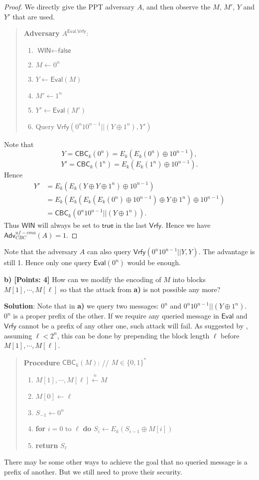 \documentclass[12pt]{article}
\newcommand{\bits}{\{0,1\}}
\newcommand{\getsn}{\stackrel{n}{\gets}}
\newcommand{\Adv}{\textsf{Adv}}
\newcommand{\CBC}{\textsf{CBC}}
\newcommand{\Eval}{\textsf{Eval}}
\newcommand{\Vrfy}{\textsf{Vrfy}}
\newcommand{\WIN}{\textsf{WIN}}
\newcommand{\true}{\textsf{true}}
\newcommand{\false}{\textsf{false}}
\theoremstyle{definition}
\begin{document}
\begin{proof}
We directly give the PPT adversary $A$, and then observe the $M$, $M'$, $Y$ and $Y'$ that are used.
\begin{quote}
{\bf Adversary} $A^{\Eval, \Vrfy}$:
\begin{enumerate}
\item $\WIN \gets \false$
\item $M \gets 0^n$
\item $Y \gets \Eval(M)$
\item $M' \gets 1^n$
\item $Y' \gets \Eval(M')$
\item Query $\Vrfy(0^n10^{n-1}||(Y \oplus 1^n), Y')$
\end{enumerate}
\end{quote}
Note that 
$$Y = \CBC_k (0^n) = E_k(E_k(0^n) \oplus 10^{n-1}),$$
$$Y' = \CBC_k (1^n) = E_k(E_k(1^n) \oplus 10^{n-1}).$$
Hence
$$\begin{aligned}
Y' &= E_k(E_k(Y \oplus Y \oplus 1^n) \oplus 10^{n-1}) \\
&= E_k(E_k(E_k(E_k(0^n) \oplus 10^{n-1}) \oplus Y \oplus 1^n) \oplus 10^{n-1}) \\
&= \CBC_k (0^n10^{n-1} || (Y \oplus 1^n)).
\end{aligned}$$
Thus $\WIN$ will always be set to $\true$ in the last $\Vrfy$. Hence we have $\Adv_{CBC}^{uf-cma}(A) = 1$.
\end{proof}
Note that the adversary $A$ can also query $\Vrfy(0^n10^{n-1}||Y, Y)$. The advantage is still 1. Hence only one query $\Eval(0^n)$ would be enough.

{\bf b) [Points: 4]} How can we modify the encoding of $M$ into blocks
$M[1], \cdots, M[\ell]$ so that the attack from {\bf a)} is not possible any more?

{\bf Solution}: Note that in {\bf a)} we query two messages: $0^n$ and $0^n10^{n-1}||(Y \oplus 1^n)$. $0^n$ is a proper prefix of the other. If we require any queried message in $\Eval$ and $\Vrfy$ cannot be a prefix of any other one, such attack will fail. As suggested by \cite{BKR94}, assuming $\ell < 2^n$, this can be done by prepending the block length $\ell$ before $M[1], \cdots, M[\ell]$.
\begin{quote}
{\bf Procedure} $\CBC_k (M)$: // $M \in \bits^*$
\begin{enumerate}
\item $M[1], \cdots, M[\ell] \getsn M$
\item $M[0] \gets \ell$
\item $S_{-1} \gets 0^n$
\item {\bf for} $i=0$ to $\ell$ {\bf do} $S_i \gets E_k (S_{i-1} \oplus M[i])$
\item {\bf return} $S_{\ell}$
\end{enumerate}
\end{quote}
There may be some other ways to achieve the goal that no queried message is a prefix of another. But we still need to prove their security.
\end{document}
